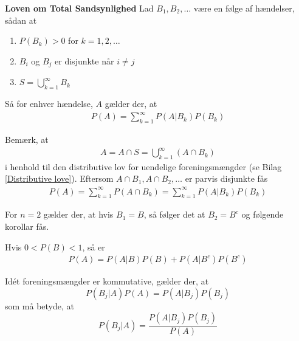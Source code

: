 \begin{minipage}\textwidth
\begin{thmx} \textbf{Loven om Total Sandsynlighed} \label{sæt:loven_om_total_sandsynlighed} %
\newline
Lad $B_1,B_2,\dots$ være en følge af hændelser, sådan at
\begin{enumerate}[label=(\textbf{\alph*})]
\item $P(B_k)>0$ for $k=1,2,\dots$
\item $B_i$ og $B_j$ er disjunkte når $i\neq j$
\item $S=\bigcup_{k=1}^\infty B_k$
\end{enumerate}
Så for enhver hændelse, $A$ gælder der, at
\begin{align*}
    P(A)=\sum_{k=1}^\infty P(A|B_k)P(B_k)
\end{align*}
\end{thmx}
\end{minipage}
\begin{bev} \textbf{} %
\newline
Bemærk, at
\begin{align*}
    A=A\cap S=\bigcup_{k=1}^\infty(A\cap B_k)
\end{align*}
i henhold til den distributive lov for uendelige foreningsmængder (se Bilag \ref{Distributive love}). 
Eftersom $A\cap B_1,A\cap B_2,\dots$ er parvis disjunkte fås
\begin{align*}
    P(A)=\sum_{k=1}^\infty P(A\cap B_k)=\sum_{k=1}^\infty P(A|B_k)P(B_k)
\end{align*}
\end{bev}
For $n=2$ gælder der, at hvis $B_1=B$, så følger det at $B_2=B^c$ og følgende korollar fås.
\begin{minipage}\textwidth
\begin{kor} \textbf{} %
\newline
Hvis $0<P(B)<1$, så er
\begin{align*}
    P(A)=P(A|B)P(B)+P(A|B^c)P(B^c)
\end{align*}
\end{kor}
\end{minipage}
\iffalse
Idét foreningsmængder er kommutative, gælder der, at
$$P(B_j|A)P(A)=P(A|B_j)P(B_j)$$
som må betyde, at
$$P(B_j|A)=\frac{P(A|B_j)P(B_j)}{P(A)}$$


